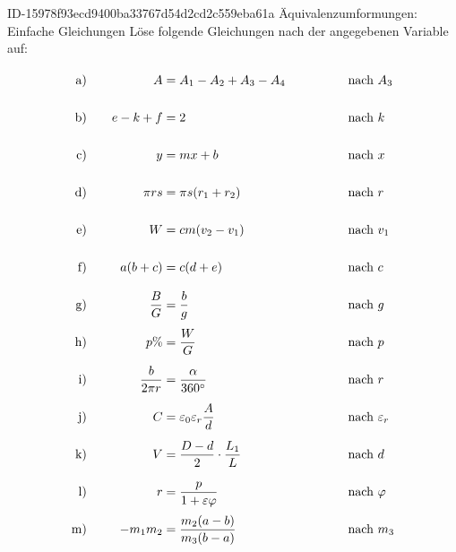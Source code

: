 \begin{exercise}
      {ID-15978f93ecd9400ba33767d54d2cd2c559eba61a}
      {Äquivalenzumformungen: Einfache Gleichungen}
  \ifproblem\problem
    \newcommand{\exnum}[1]{\text{\rule[-2.5ex]{0pt}{6ex}#1}}
    Löse folgende Gleichungen nach der angegebenen Variable auf:
    \allowdisplaybreaks
    \begin{alignat*}{4}
      \exnum{a)}&\quad &                A&=A_{1}-A_{2}+A_{3}-A_{4}                   & \quad&\quad & \quad&\text{nach $A_{3}$}           \\
      \exnum{b)}&\quad &            e-k+f&=2                                         & \quad&\quad & \quad&\text{nach $k$}               \\
      \exnum{c)}&\quad &                y&=mx+b                                      & \quad&\quad & \quad&\text{nach $x$}               \\
      \exnum{d)}&\quad &           \pi rs&=\pi s(r_{1}+r_{2})                        & \quad&\quad & \quad&\text{nach $r$}               \\
      \exnum{e)}&\quad &                W&=cm(v_{2}-v_{1})                           & \quad&\quad & \quad&\text{nach $v_{1}$}           \\
      \exnum{f)}&\quad &           a(b+c)&=c(d+e)                                    & \quad&\quad & \quad&\text{nach $c$}               \\
      \exnum{g)}&\quad &      \frac{B}{G}&=\frac{b}{g}                               & \quad&\quad & \quad&\text{nach $g$}               \\
      \exnum{h)}&\quad &              p\%&=\frac{W}{G}                               & \quad&\quad & \quad&\text{nach $p$}               \\
      \exnum{i)}&\quad & \frac{b}{2\pi r}&=\frac{\alpha}{360^{\circ}}                & \quad&\quad & \quad&\text{nach $r$}               \\
      \exnum{j)}&\quad &                C&=\varepsilon_{0}\varepsilon_{r}\frac{A}{d} & \quad&\quad & \quad&\text{nach $\varepsilon_{r}$} \\
      \exnum{k)}&\quad &                V&=\frac{D-d}{2}\cdot\frac{L_{1}}{L}         & \quad&\quad & \quad&\text{nach $d$}               \\
      \exnum{l)}&\quad &                r&=\frac{p}{1+\varepsilon\varphi}            & \quad&\quad & \quad&\text{nach $\varphi$}         \\
      \exnum{m)}&\quad &      -m_{1}m_{2}&=\frac{m_{2}(a-b)}{m_{3}(b-a)}             & \quad&\quad & \quad&\text{nach $m_{3}$}
    \end{alignat*}
  \fi
\end{exercise}
